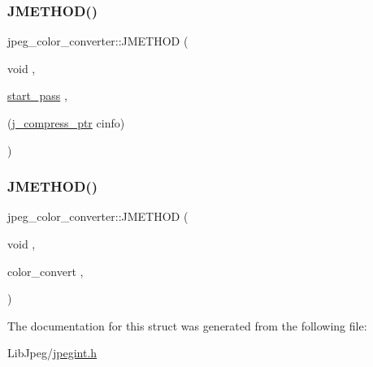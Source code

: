 \subsubsection{\texorpdfstring{JMETHOD()}{JMETHOD()}\hspace{0.1cm}{\footnotesize\ttfamily [1/2]}}
{\footnotesize\ttfamily jpeg\+\_\+color\+\_\+converter\+::\+J\+M\+E\+T\+H\+OD (\begin{DoxyParamCaption}\item[{void}]{,  }\item[{\mbox{\hyperlink{jddctmgr_8c_a1964f006adb8fb80f57e455f6452aec1}{start\+\_\+pass}}}]{,  }\item[{(\mbox{\hyperlink{jpeglib_8h_add2a072c54e3a51550f4975f7ddb91e7}{j\+\_\+compress\+\_\+ptr}} cinfo)}]{ }\end{DoxyParamCaption})}

\mbox{\label{structjpeg__color__converter_aed90a059ad823add4785973694ed5eb9}} 
\subsubsection{\texorpdfstring{JMETHOD()}{JMETHOD()}\hspace{0.1cm}{\footnotesize\ttfamily [2/2]}}
{\footnotesize\ttfamily jpeg\+\_\+color\+\_\+converter\+::\+J\+M\+E\+T\+H\+OD (\begin{DoxyParamCaption}\item[{void}]{,  }\item[{color\+\_\+convert}]{,  }\item[{(\mbox{\hyperlink{jpeglib_8h_add2a072c54e3a51550f4975f7ddb91e7}{j\+\_\+compress\+\_\+ptr}} cinfo, \mbox{\hyperlink{jpeglib_8h_ac9d5d1b829ed51769db69a37271a7e91}{J\+S\+A\+M\+P\+A\+R\+R\+AY}} input\+\_\+buf, \mbox{\hyperlink{jpeglib_8h_a4bf858e4d42202287e786bdec2f3b62b}{J\+S\+A\+M\+P\+I\+M\+A\+GE}} \mbox{\hyperlink{jdct_8h_ad7e4660a191b1a791748dd44d5a7a0ec}{output\+\_\+buf}}, \mbox{\hyperlink{jmorecfg_8h_a04ed4674f6f1d0d50ec241531e38274f}{J\+D\+I\+M\+E\+N\+S\+I\+ON}} \mbox{\hyperlink{jpegint_8h_a58518ef80cb2e9d15ba1837bef666ec6}{output\+\_\+row}}, int \mbox{\hyperlink{jpegint_8h_ac5f8b57092da0f421713ba171c4c9f87}{num\+\_\+rows}})}]{ }\end{DoxyParamCaption})}



The documentation for this struct was generated from the following file\+:\begin{DoxyCompactItemize}
\item 
Lib\+Jpeg/\mbox{\hyperlink{jpegint_8h}{jpegint.\+h}}\end{DoxyCompactItemize}
